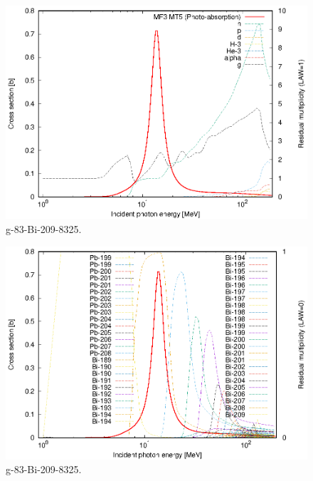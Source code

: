 \begin{figure}
 \includegraphics[width=\linewidth]{eps/g_83-Bi-209_8325.eps}
  \caption{g-83-Bi-209-8325.}
\end{figure}
\begin{figure}
 \includegraphics[width=\linewidth]{eps-law0/g_83-Bi-209_8325.eps}
 \caption{g-83-Bi-209-8325.}
\end{figure}
\newpage \clearpage

